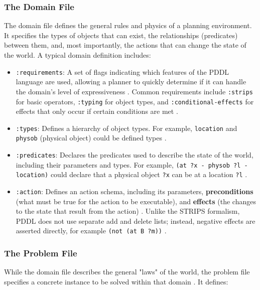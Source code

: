 \documentclass[12pt, a4paper, oneside]{report} %
\begin{document}
\subsubsection*{The Domain File}

The domain file defines the general rules and physics of a planning environment. It specifies the types of objects that can exist, the relationships (predicates) between them, and, most importantly, the actions that can change the state of the world. A typical domain definition includes:

\begin{itemize}
    \item \texttt{:requirements}: A set of flags indicating which features of the PDDL language are used, allowing a planner to quickly determine if it can handle the domain's level of expressiveness . Common requirements include \texttt{:strips} for basic operators, \texttt{:typing} for object types, and \texttt{:conditional-effects} for effects that only occur if certain conditions are met \cite{mcdermott1998pddl}.
    \item \texttt{:types}: Defines a hierarchy of object types. For example, \texttt{location} and \texttt{physob} (physical object) could be defined types .
    \item \texttt{:predicates}: Declares the predicates used to describe the state of the world, including their parameters and types. For example, \texttt{(at ?x - physob ?l - location)} could declare that a physical object \texttt{?x} can be at a location \texttt{?l} .
    \item \texttt{:action}: Defines an action schema, including its parameters, \textbf{preconditions} (what must be true for the action to be executable), and \textbf{effects} (the changes to the state that result from the action) . Unlike the STRIPS formalism, PDDL does not use separate add and delete lists; instead, negative effects are asserted directly, for example \texttt{(not (at B ?m))} \cite{mcdermott1998pddl, thiebaux2005defense}.
\end{itemize}

\subsubsection*{The Problem File}

While the domain file describes the general "laws" of the world, the problem file specifies a concrete instance to be solved within that domain \cite{mcdermott1998pddl}. It defines:
\end{document}
